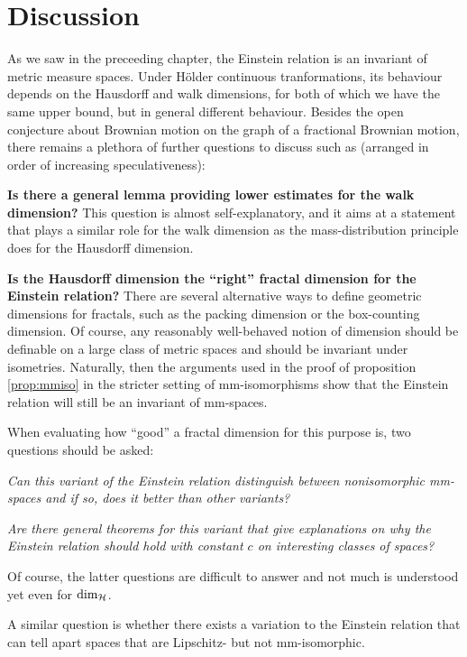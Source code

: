 \chapter*{Discussion}

As we saw in the preceeding chapter, the Einstein relation is an invariant of metric measure spaces. Under H\"older continuous tranformations, its behaviour depends on the Hausdorff and walk dimensions, for both of which we have the same upper bound, but in general different behaviour. Besides the open conjecture about Brownian motion on the graph of a fractional Brownian motion, there remains a plethora of further questions to discuss such as (arranged in order of increasing speculativeness):

\textbf{Is there a general lemma providing lower estimates for the walk dimension?} This question is almost self-explanatory, and it aims at a statement that plays a similar role for the walk dimension as the mass-distribution principle does for the Hausdorff dimension.

\textbf{Is the Hausdorff dimension the ``right'' fractal dimension for the Einstein relation?} There are several alternative ways to define geometric dimensions for fractals, such as the packing dimension or the box-counting dimension. Of course, any reasonably well-behaved notion of dimension should be definable on a large class of metric spaces and should be invariant under isometries. Naturally, then the arguments used in the proof of proposition \ref{prop:mmiso} in the stricter setting of mm-isomorphisms show that the Einstein relation will still be an invariant of mm-spaces. 
  
When evaluating how ``good'' a fractal dimension for this purpose is, two questions should be asked: 
\begin{compactenum}
  \item \emph{Can this variant of the Einstein relation distinguish between nonisomorphic mm-spaces and if so, does it better than other variants?}
  \item \emph{Are there general theorems for this variant that give explanations on why the Einstein relation should hold with constant $c$ on interesting classes of spaces?}
\end{compactenum}
Of course, the latter questions are difficult to answer and not much is understood yet even for $\dim_{\mathcal{H}}$. 

A similar question is whether there exists a variation to the Einstein relation that can tell apart spaces that are Lipschitz- but not mm-isomorphic.

